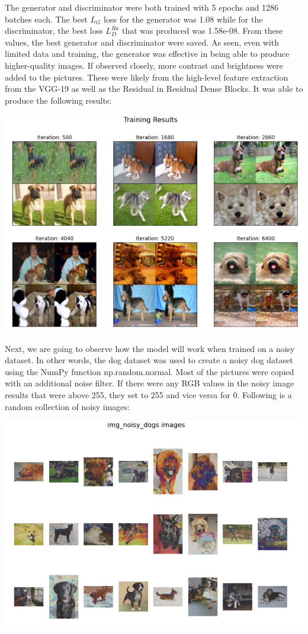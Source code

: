 \documentclass{article}
\begin{document}
The generator and discriminator were both trained with 5 epochs and 1286 batches each. The best \(L_G\) loss for the generator was 1.08 while for the discriminator, the best loss \(L_D^{Ra}\) that was produced was 1.58e-08. From these values, the best generator and discriminator were saved. As seen, even with limited data and training, the generator was effective in being able to produce higher-quality images. If observed closely, more contrast and brightness were added to the pictures. These were likely from the high-level feature extraction from the VGG-19 as well as the Residual in Residual Dense Blocks. It was able to produce the following results:

\begin{center}
\includegraphics[scale=0.5]{images/img_dogs_training_results.jpg}
\end{center}

 Next, we are going to observe how the model will work when trained on a noisy dataset. In other words, the dog dataset was used to create a noisy dog dataset using the NumPy function np.random.normal. Most of the pictures were copied with an additional noise filter. If there were any RGB values in the noisy image results that were above 255, they set to 255 and vice versa for 0. Following is a random collection of noisy images:

\begin{center}
\includegraphics[scale=0.5]{images/img_noisy_dogs_images.jpg}
\end{center}
\end{document}
